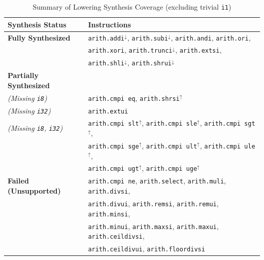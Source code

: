 \begin{table}[htpb]
    \centering
    \small
    \caption{Summary of Lowering Synthesis Coverage (excluding trivial \texttt{i1})}
    \begin{tabular}{@{}lp{10cm}@{}}
        \toprule
        \textbf{Synthesis Status} & \textbf{Instructions} \\
        \midrule
        
        \textbf{Fully Synthesized} & 
        \texttt{arith.addi}$^{\downarrow}$, \texttt{arith.subi}$^{\downarrow}$, \texttt{arith.andi}, \texttt{arith.ori}, \\
        & \texttt{arith.xori}, \texttt{arith.trunci}$^{\downarrow}$, \texttt{arith.extsi}, \\
        & \texttt{arith.shli}$^{\downarrow}$, \texttt{arith.shrui}$^{\downarrow}$ \\
        \midrule
        
        \textbf{Partially Synthesized} & \\
        \textit{(Missing \texttt{i8})} & \texttt{arith.cmpi eq}, \texttt{arith.shrsi}$^{\uparrow}$ \\
        \addlinespace
        \textit{(Missing \texttt{i32})} & \texttt{arith.extui} \\
        \addlinespace
        \textit{(Missing \texttt{i8}, \texttt{i32})} & \texttt{arith.cmpi slt}$^{\uparrow}$, \texttt{arith.cmpi sle}$^{\uparrow}$, \texttt{arith.cmpi sgt}$^{\uparrow}$, \\
        & \texttt{arith.cmpi sge}$^{\uparrow}$, \texttt{arith.cmpi ult}$^{\uparrow}$, \texttt{arith.cmpi ule}$^{\uparrow}$, \\
        & \texttt{arith.cmpi ugt}$^{\uparrow}$, \texttt{arith.cmpi uge}$^{\uparrow}$ \\
        \midrule
        
        \textbf{Failed (Unsupported)} & 
        \texttt{arith.cmpi ne}, \texttt{arith.select}, \texttt{arith.muli}, \texttt{arith.divsi}, \\
        & \texttt{arith.divui}, \texttt{arith.remsi}, \texttt{arith.remui}, \texttt{arith.minsi}, \\
        & \texttt{arith.minui}, \texttt{arith.maxsi}, \texttt{arith.maxui}, \texttt{arith.ceildivsi}, \\
        & \texttt{arith.ceildivui}, \texttt{arith.floordivsi} \\
        \bottomrule
    \end{tabular}
    

\end{table}
